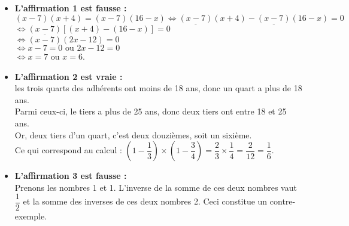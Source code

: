 \begin{itemize}
   \item {\bf L'affirmation 1 est fausse :} \\
   $(x - 7)(x + 4) =(x -7)(16 - x) \iff \underline{(x - 7)}(x + 4) -\underline{(x -7)}(16 - x) =0$ \\
   \hspace*{4.6cm} $\iff \underline{(x - 7)}[(x + 4) -(16 - x)] =0$ \\
   \hspace*{4.6cm} $ \iff (x - 7)(2x-12) =0$ \\
   \hspace*{4.6cm} $ \iff x-7 =0 \text{ ou } 2x-12 =0$ \\
   \hspace*{4.6cm} $ \iff x =7 \text{ ou } x =6$.
   \item {\bf L'affirmation 2 est vraie :} \\
   les trois quarts des adhérents ont moins de 18 ans, donc un quart a plus de 18 ans. \\
   Parmi ceux-ci, le tiers a plus de 25 ans, donc deux tiers ont entre 18 et 25 ans. \\
   Or, deux tiers d'un quart, c'est deux douzièmes, soit un sixième. \\
   Ce qui correspond au calcul : $\left(1-\dfrac13\right)\times\left(1-\dfrac34\right) =\dfrac23\times\dfrac14 =\dfrac2{12} =\dfrac16$.
   \item {\bf L'affirmation 3 est fausse :} \\
   Prenons les nombres 1 et 1. L'inverse de la somme de ces deux nombres vaut $\dfrac12$ et la somme des inverses de ces deux nombres 2. Ceci constitue un contre-exemple.
\end{itemize}
